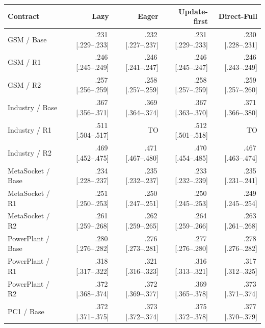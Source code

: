 \begingroup\footnotesize\setlength{\tabcolsep}{3pt}
\newcommand{\PrepTime}[3]{#1\,{\scriptsize[#2--#3]}}
\begin{tabular}{@{}lrrrr@{}}\toprule
Contract & Lazy & Eager & Update-first & Direct-Full\\\midrule
GSM / Base & \PrepTime{.231}{.229}{.233} & \PrepTime{.232}{.227}{.237} & \PrepTime{.231}{.229}{.233} & \PrepTime{.230}{.228}{.231}\\
GSM / R1 & \PrepTime{.246}{.245}{.249} & \PrepTime{.246}{.241}{.247} & \PrepTime{.246}{.245}{.247} & \PrepTime{.246}{.243}{.249}\\
GSM / R2 & \PrepTime{.257}{.256}{.259} & \PrepTime{.258}{.257}{.259} & \PrepTime{.258}{.257}{.259} & \PrepTime{.259}{.257}{.260}\\
\addlinespace[3pt]
Industry / Base & \PrepTime{.367}{.356}{.371} & \PrepTime{.369}{.364}{.374} & \PrepTime{.367}{.363}{.370} & \PrepTime{.371}{.366}{.380}\\
Industry / R1 & \PrepTime{.511}{.504}{.517} & TO & \PrepTime{.512}{.501}{.518} & TO\\
Industry / R2 & \PrepTime{.469}{.452}{.475} & \PrepTime{.471}{.467}{.480} & \PrepTime{.470}{.454}{.485} & \PrepTime{.467}{.463}{.474}\\
\addlinespace[3pt]
MetaSocket / Base & \PrepTime{.234}{.228}{.237} & \PrepTime{.235}{.232}{.237} & \PrepTime{.233}{.232}{.239} & \PrepTime{.235}{.231}{.241}\\
MetaSocket / R1 & \PrepTime{.251}{.250}{.253} & \PrepTime{.250}{.247}{.251} & \PrepTime{.250}{.245}{.253} & \PrepTime{.249}{.245}{.254}\\
MetaSocket / R2 & \PrepTime{.261}{.259}{.268} & \PrepTime{.262}{.259}{.265} & \PrepTime{.264}{.259}{.266} & \PrepTime{.263}{.261}{.268}\\
\addlinespace[3pt]
PowerPlant / Base & \PrepTime{.280}{.276}{.282} & \PrepTime{.276}{.273}{.281} & \PrepTime{.277}{.276}{.280} & \PrepTime{.278}{.276}{.282}\\
PowerPlant / R1 & \PrepTime{.318}{.317}{.322} & \PrepTime{.321}{.316}{.323} & \PrepTime{.316}{.313}{.321} & \PrepTime{.317}{.312}{.325}\\
PowerPlant / R2 & \PrepTime{.372}{.368}{.374} & \PrepTime{.372}{.369}{.377} & \PrepTime{.369}{.365}{.378} & \PrepTime{.373}{.371}{.374}\\
\addlinespace[3pt]
PC1 / Base & \PrepTime{.372}{.371}{.375} & \PrepTime{.373}{.372}{.374} & \PrepTime{.375}{.372}{.378} & \PrepTime{.377}{.370}{.379}\\

\end{tabular}
